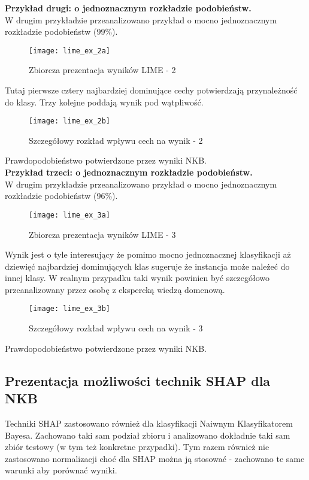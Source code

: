 \textbf{Przykład drugi: o jednoznacznym rozkładzie podobieństw.}\\
W drugim przykładzie przeanalizowano przykład o mocno jednoznacznym rozkładzie podobieństw (99\%).\\

\begin{figure}[H]
    \centering
    \texttt{[image: lime\_ex\_2a]}
    \caption{Zbiorcza prezentacja wyników LIME - 2}
    \label{fig:lime_ex_2a}
\end{figure}

Tutaj pierwsze cztery najbardziej dominujące cechy potwierdzają przynależność do klasy. Trzy kolejne poddają wynik pod wątpliwość.\\

\begin{figure}[H]
    \centering
    \texttt{[image: lime\_ex\_2b]}
    \caption{Szczegółowy rozkład wpływu cech na wynik - 2}
    \label{fig:lime_ex_2b}
\end{figure}

Prawdopodobieństwo potwierdzone przez wyniki NKB.\\

\textbf{Przykład trzeci: o jednoznacznym rozkładzie podobieństw.}\\
W drugim przykładzie przeanalizowano przykład o mocno jednoznacznym rozkładzie podobieństw (96\%).\\

\begin{figure}[H]
    \centering
    \texttt{[image: lime\_ex\_3a]}
    \caption{Zbiorcza prezentacja wyników LIME - 3}
    \label{fig:lime_ex_3a}
\end{figure}

Wynik jest o tyle interesujący że pomimo mocno jednoznacznej klasyfikacji aż dziewięć najbardziej dominujących klas sugeruje że instancja może należeć do innej klasy. W realnym przypadku taki wynik powinien być szczegółowo przeanalizowany przez osobę z ekspercką wiedzą domenową.\\

\begin{figure}[H]
    \centering
    \texttt{[image: lime\_ex\_3b]}
    \caption{Szczegółowy rozkład wpływu cech na wynik - 3}
    \label{fig:lime_ex_3b}
\end{figure}

Prawdopodobieństwo potwierdzone przez wyniki NKB.\\

\subsection{Prezentacja możliwości technik SHAP dla NKB}
Techniki SHAP zastosowano również dla klasyfikacji Naiwnym Klasyfikatorem Bayesa. Zachowano taki sam podział zbioru i analizowano dokładnie taki sam zbiór testowy (w tym też konkretne przypadki). Tym razem również nie zastosowano normalizacji choć dla SHAP można ją stosować - zachowano te same warunki aby porównać wyniki.\\


